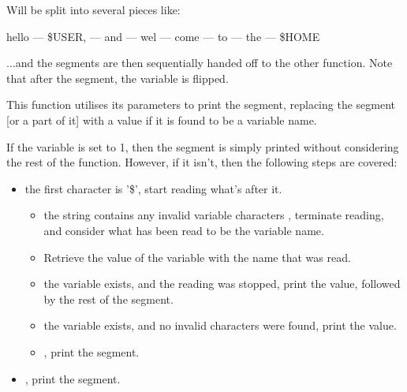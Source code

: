 \documentclass[12pt, a4paper]{report}
\begin{document}
                Will be split into several pieces like:

                \begin{center}
                    hello --- \$USER, --- and --- wel --- come --- to --- the --- \$HOME
                \end{center}

                ...and the segments are then sequentially handed off to the other function.
                Note that after the  segment, the  variable is flipped.

                \clearpage
            
                This function utilises its parameters to print the segment,
                replacing the segment [or a part of it] with a value if it
                is found to be a variable name.

                If the  variable is set to 1, then the segment is
                simply printed without considering the rest of the function.
                However, if it isn't, then the following steps are covered:

                \begin{itemize}
                    \item {} the first character is '\$', start reading what's after it.
                        \begin{itemize}
                            \item {} the string contains any invalid variable characters
                                ,
                                terminate reading, and consider what has been read to be
                                the variable name.
                            \item Retrieve the value of the variable with the name that
                                was read.
                            \item {} the variable exists, and the reading was stopped,
                                print the value, followed by the rest of the segment.
                            \item {} the variable exists, and no invalid characters were
                                found, print the value.
                            \item {}, print the segment.
                        \end{itemize}
                    \item {}, print the segment.
                \end{itemize}
\end{document}
